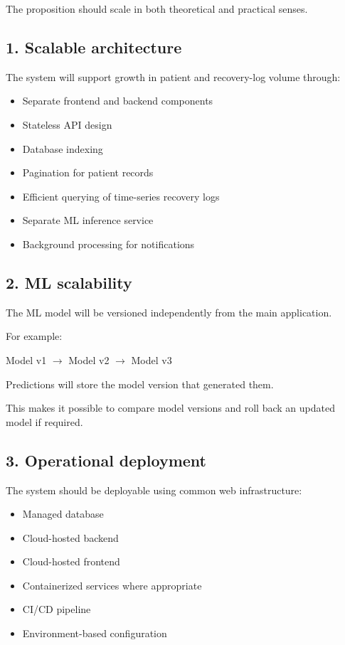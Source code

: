 \documentclass[11pt,a4paper]{article}
\begin{document}
The proposition should scale in both theoretical and
practical senses.

\subsection{1. Scalable architecture}

The system will support growth in patient and recovery-log
volume through:
\begin{itemize}[leftmargin=0.7cm]
    \item Separate frontend and backend components
    \item Stateless API design
    \item Database indexing
    \item Pagination for patient records
    \item Efficient querying of time-series recovery logs
    \item Separate ML inference service
    \item Background processing for notifications
\end{itemize}

\subsection{2. ML scalability}

The ML model will be versioned independently from the main
application.

For example:

Model v1 $\rightarrow$ Model v2 $\rightarrow$ Model v3

Predictions will store the model version that generated them.

This makes it possible to compare model versions and roll
back an updated model if required.

\subsection{3. Operational deployment}

The system should be deployable using common web
infrastructure:
\begin{itemize}[leftmargin=0.7cm]
    \item Managed database
    \item Cloud-hosted backend
    \item Cloud-hosted frontend
    \item Containerized services where appropriate
    \item CI/CD pipeline
    \item Environment-based configuration
\end{itemize}
\end{document}
